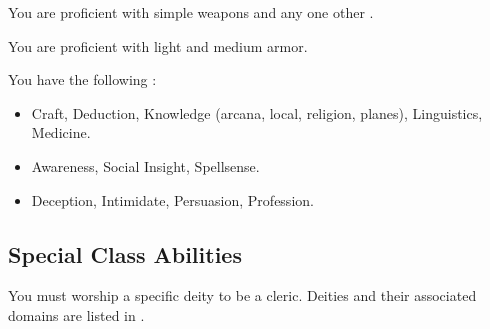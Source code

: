         You are proficient with simple weapons and any one other .

        You are proficient with light and medium armor.

        You have the following :
        \begin{itemize}
            \item {} Craft, Deduction, Knowledge (arcana, local, religion, planes), Linguistics, Medicine.
            \item {} Awareness, Social Insight, Spellsense.
            \item {} Deception, Intimidate, Persuasion, Profession.
        \end{itemize}

    \subsection{Special Class Abilities}

        You must worship a specific deity to be a cleric.
        Deities and their associated domains are listed in .

